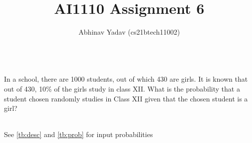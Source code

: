 \documentclass[journal,11pt,twocolumn]{IEEEtran}
\begin{document}
    \newcommand*{\permcomb}[4][0mu]{{{}^{#3}\mkern#1#2_{#4}}}
    \newcommand*{\perm}[1][-3mu]{\permcomb[#1]{P}}
    \newcommand*{\comb}[1][-1mu]{\permcomb[#1]{C}}
    \makeatletter
    \makeatother
    \let\StandardTheFigure\thefigure
    \let\vec\mathbf
    \def\putbox#1#2#3{\makebox[0in][l]{\makebox[#1][l]{}\raisebox{\baselineskip}[0in][0in]{\raisebox{#2}[0in][0in]{#3}}}}
        \def\rightbox#1{\makebox[0in][r]{#1}}
        \def\centbox#1{\makebox[0in]{#1}}
        \def\topbox#1{\raisebox{-\baselineskip}[0in][0in]{#1}}
        \def\midbox#1{\raisebox{-0.5\baselineskip}[0in][0in]{#1}}
    \vspace{3cm}
    \title{AI1110 Assignment 6}
    \author{Abhinav Yadav (cs21btech11002)}
    \maketitle
    \newpage

    \\
    In a school, there are 1000 students, out of which 430 are girls. It is known
that out of 430, 10\% of the girls study in class XII. What is the probability that a student
chosen randomly studies in Class XII given that the chosen student is a girl?

    \solution\\
    See \autoref{tb:desc} and \autoref{tb:prob} for input probabilities
\end{document}
